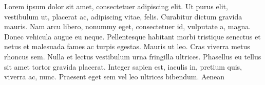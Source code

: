 \documentclass[swedish]{hisspik}
\begin{document}
%
\begin{spik}%
Lorem ipsum dolor sit amet, consectetuer adipiscing elit. Ut
purus elit, vestibulum ut, placerat ac, adipiscing vitae, felis.
Curabitur dictum gravida mauris. Nam arcu libero, nonummy
eget, consectetuer id, vulputate a, magna. Donec vehicula
augue eu neque. Pellentesque habitant morbi tristique senectus
et netus et malesuada fames ac turpis egestas. Mauris ut leo.
Cras viverra metus rhoncus sem. Nulla et lectus vestibulum
urna fringilla ultrices. Phasellus eu tellus sit amet tortor gravida
placerat. Integer sapien est, iaculis in, pretium quis, viverra
ac, nunc. Praesent eget sem vel leo ultrices bibendum. Aenean%
\end{spik}%
\end{document}
